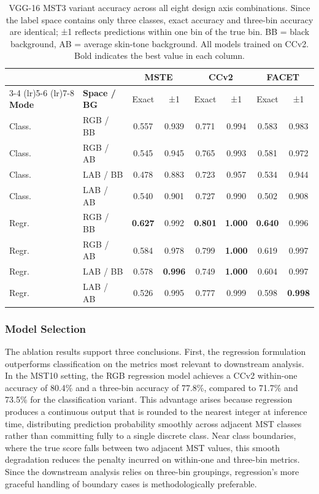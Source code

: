 \begin{table}[htbp]
	\centering
	\caption{VGG-16 MST3 variant accuracy across all eight design axis combinations. Since the label space contains only three classes, exact accuracy and three-bin accuracy are identical; ±1 reflects predictions within one bin of the true bin. BB = black background, AB = average skin-tone background. All models trained on CCv2. Bold indicates the best value in each column.}
	\label{tab:vgg16_mst3}
	\small
	\begin{tabular}{llcccccc}
		\toprule
		& & \multicolumn{2}{c}{\textbf{MSTE}} & \multicolumn{2}{c}{\textbf{CCv2}} & \multicolumn{2}{c}{\textbf{FACET}} \\
		\cmidrule(lr){3-4} \cmidrule(lr){5-6} \cmidrule(lr){7-8}
		\textbf{Mode} & \textbf{Space / BG} & Exact & ±1 & Exact & ±1 & Exact & ±1 \\
		\midrule
		Class. & RGB / BB & 0.557 & 0.939 & 0.771 & 0.994 & 0.583 & 0.983 \\
		Class. & RGB / AB & 0.545 & 0.945 & 0.765 & 0.993 & 0.581 & 0.972 \\
		Class. & LAB / BB & 0.478 & 0.883 & 0.723 & 0.957 & 0.534 & 0.944 \\
		Class. & LAB / AB & 0.540 & 0.901 & 0.727 & 0.990 & 0.502 & 0.908 \\
		Regr.  & RGB / BB & \textbf{0.627} & 0.992 & \textbf{0.801} & \textbf{1.000} & \textbf{0.640} & 0.996 \\
		Regr.  & RGB / AB & 0.584 & 0.978 & 0.799 & \textbf{1.000} & 0.619 & 0.997 \\
		Regr.  & LAB / BB & 0.578 & \textbf{0.996} & 0.749 & \textbf{1.000} & 0.604 & 0.997 \\
		Regr.  & LAB / AB & 0.526 & 0.995 & 0.777 & 0.999 & 0.598 & \textbf{0.998} \\
		\bottomrule
	\end{tabular}
\end{table}

\subsubsection{Model Selection}

The ablation results support three conclusions. First, the regression formulation outperforms classification on the metrics most relevant to downstream analysis. In the MST10 setting, the RGB regression model achieves a CCv2 within-one accuracy of 80.4\% and a three-bin accuracy of 77.8\%, compared to 71.7\% and 73.5\% for the classification variant. This advantage arises because regression produces a continuous output that is rounded to the nearest integer at inference time, distributing prediction probability smoothly across adjacent MST classes rather than committing fully to a single discrete class. Near class boundaries, where the true score falls between two adjacent MST values, this smooth degradation reduces the penalty incurred on within-one and three-bin metrics. Since the downstream analysis relies on three-bin groupings, regression's more graceful handling of boundary cases is methodologically preferable.

